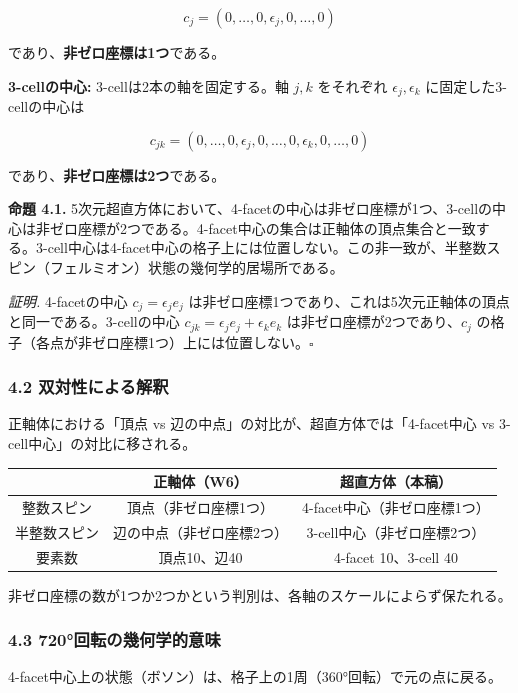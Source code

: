 \documentclass[a4paper,11pt]{ltjsarticle}
\newcounter{none}
\begin{document}
\[c_j = (0, \ldots, 0, \epsilon_j, 0, \ldots, 0)\]

であり、\textbf{非ゼロ座標は1つ}である。

\textbf{3-cellの中心:} 3-cellは2本の軸を固定する。軸 $j, k$ をそれぞれ $\epsilon_j, \epsilon_k$ に固定した3-cellの中心は

\[c_{jk} = (0, \ldots, 0, \epsilon_j, 0, \ldots, 0, \epsilon_k, 0, \ldots, 0)\]

であり、\textbf{非ゼロ座標は2つ}である。

\textbf{命題 4.1.} 5次元超直方体において、4-facetの中心は非ゼロ座標が1つ、3-cellの中心は非ゼロ座標が2つである。4-facet中心の集合は正軸体の頂点集合と一致する。3-cell中心は4-facet中心の格子上には位置しない。この非一致が、半整数スピン（フェルミオン）状態の幾何学的居場所である。

\emph{証明.} 4-facetの中心 $c_j = \epsilon_j e_j$ は非ゼロ座標1つであり、これは5次元正軸体の頂点と同一である。3-cellの中心 $c_{jk} = \epsilon_j e_j + \epsilon_k e_k$ は非ゼロ座標が2つであり、$c_j$ の格子（各点が非ゼロ座標1つ）上には位置しない。$\square$

\subsubsection*{4.2 双対性による解釈}

正軸体における「頂点 vs 辺の中点」の対比が、超直方体では「4-facet中心 vs 3-cell中心」の対比に移される。

{\def\LTcaptype{none}
\begin{longtable}[]{@{}ccc@{}}
\toprule
& 正軸体（W6） & 超直方体（本稿） \\
\midrule
\endhead
\bottomrule
\endlastfoot
整数スピン & 頂点（非ゼロ座標1つ） & 4-facet中心（非ゼロ座標1つ） \\
半整数スピン & 辺の中点（非ゼロ座標2つ） & 3-cell中心（非ゼロ座標2つ） \\
要素数 & 頂点10、辺40 & 4-facet 10、3-cell 40 \\
\end{longtable}
}

非ゼロ座標の数が1つか2つかという判別は、各軸のスケールによらず保たれる。

\subsubsection*{4.3 720°回転の幾何学的意味}

4-facet中心上の状態（ボソン）は、格子上の1周（360°回転）で元の点に戻る。
\end{document}

